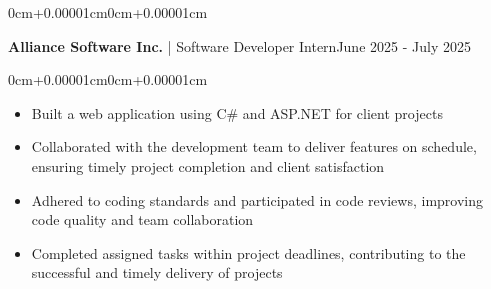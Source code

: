 \documentclass[10pt, letterpaper]{article}
\newenvironment{highlights}{\begin{itemize}[topsep=0.10cm,parsep=0.10cm,partopsep=0pt,itemsep=0pt,leftmargin=0cm+10pt]}{\end{itemize}}
\newenvironment{onecolentry}{\begin{adjustwidth}{0cm+0.00001cm}{0cm+0.00001cm}}{\end{adjustwidth}}
\newenvironment{twocolentry}[2][]{\onecolentry\def\secondColumn{#2}\setcolumnwidth{\fill,5cm}\begin{paracol}{2}}{\switchcolumn \raggedleft \secondColumn\end{paracol}\endonecolentry}
\begin{document}
    \begin{twocolentry}{June 2025 - July 2025}
    \textbf{Alliance Software Inc.} | Software Developer Intern\end{twocolentry}
    \vspace{0.10cm}
    \begin{onecolentry}
        \small
    \begin{highlights}
                \item Built a web application using C\# and ASP.NET for client projects
            \item Collaborated with the development team to deliver features on schedule, ensuring timely project completion and client satisfaction
            \item Adhered to coding standards and participated in code reviews, improving code quality and team collaboration
            \item Completed assigned tasks within project deadlines, contributing to the successful and timely delivery of projects
        \end{highlights}
    \end{onecolentry}
    \vspace{0.15cm}
\end{document}
